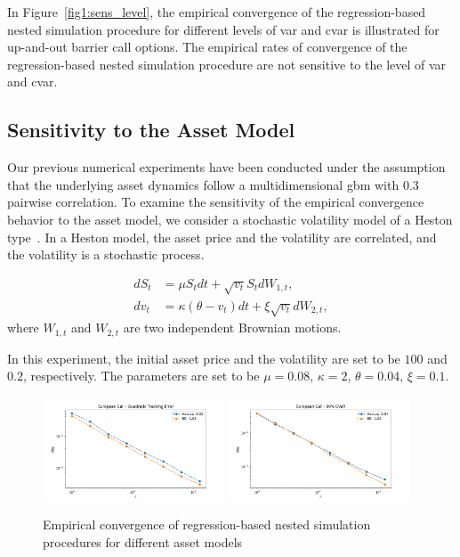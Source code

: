 In Figure~\ref{fig1:sens_level}, the empirical convergence of the regression-based nested simulation procedure for different levels of \gls{var} and \gls{cvar} is illustrated for up-and-out barrier call options.
The empirical rates of convergence of the regression-based nested simulation procedure are not sensitive to the level of \gls{var} and \gls{cvar}.

\subsection{Sensitivity to the Asset Model}\label{sec1:sensitivity-assetModel}

Our previous numerical experiments have been conducted under the assumption that the underlying asset dynamics follow a multidimensional \gls{gbm} with $0.3$ pairwise correlation.
To examine the sensitivity of the empirical convergence behavior to the asset model, we consider a stochastic volatility model of a Heston type~\citep{heston1993closed}.
In a Heston model, the asset price and the volatility are correlated, and the volatility is a stochastic process.

\begin{align*}
    dS_t &= \mu S_t dt + \sqrt{v_t} S_t dW_{1,t}, \\
    dv_t &= \kappa (\theta - v_t) dt + \xi \sqrt{v_t} dW_{2,t},
\end{align*}
where $W_{1,t}$ and $W_{2,t}$ are two independent Brownian motions.

In this experiment, the initial asset price and the volatility are set to be $100$ and $0.2$, respectively. The parameters are set to be $\mu = 0.08$, $\kappa = 2$, $\theta = 0.04$, $\xi = 0.1$.

\begin{figure}[ht!] 
    \centering
    \includegraphics[width=0.48\textwidth]{./project1/figures/figure10a.png}
    \includegraphics[width=0.48\textwidth]{./project1/figures/figure10b.png}
    \caption{Empirical convergence of regression-based nested simulation procedures for different asset models}
\label{fig1:sens_model}
\end{figure}

